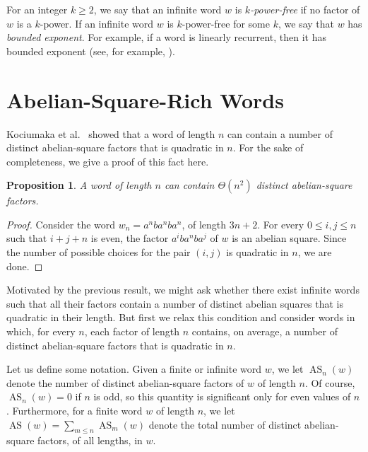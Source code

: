 \documentclass[11pt,reqno]{amsart}
\numberwithin{equation}{section}
\theoremstyle{plain}
\newtheorem{proposition}[theorem]{Proposition}
\theoremstyle{definition}
\theoremstyle{remark}
\DeclareMathOperator{\AS}{AS}
\newcommand{\ass}[2]{\AS_{#2}(#1)}
\newcommand{\as}[1]{\AS(#1)}
\begin{document}
For an integer $k\geq 2$, we say that an infinite word $w$ is \emph{$k$-power-free} if no factor of $w$ is a $k$-power. If an infinite word $w$ is $k$-power-free for some $k$, we say that $w$ has \emph{bounded exponent}. 
For example, if a word is linearly recurrent, then it has bounded exponent (see, for example, \cite{Dur99}).

\section{Abelian-Square-Rich Words}

Kociumaka et al.~\cite{Ry14} showed that a word of length $n$ can contain a number of distinct abelian-square factors that is quadratic in $n$. For the sake of completeness, we give a proof of this fact here.

\begin{proposition}\label{prop:as}
 A word of length $n$ can contain $\Theta(n^{2})$ distinct abelian-square factors.
\end{proposition}

\begin{proof}
 Consider the word $w_n=a^{n}ba^{n}ba^{n}$, of length $3n+2$. For every $0\leq i,j\leq n$ such that $i+j+n$ is even, the factor $a^{i}ba^{n}ba^{j}$ of $w$ is an abelian square. Since the number of possible choices for the pair $(i,j)$ is quadratic in $n$, we are done. %
\end{proof}

Motivated by the previous result, we might ask whether there exist infinite words such that all their factors contain a number of distinct abelian squares that is quadratic in their length. But first we relax this condition and consider words in which, for every $n$, each factor of length $n$ contains, on average, a number of distinct abelian-square factors that is quadratic in $n$.

Let us define some notation. Given a finite or infinite word $w$, we
let $\ass{w} {n}$ denote the number of distinct abelian-square factors of
$w$ of length $n$. Of course,  $\ass{w} {n} =0$ if $n$ is odd, so this
quantity is significant only for even values of $n$. Furthermore, for a
finite word $w$ of length $n$, we let $\as{w} =\sum_{m\leq n} \ass{w} {m}$ denote the
total number of distinct abelian-square factors, of all lengths, in $w$.
\end{document}
